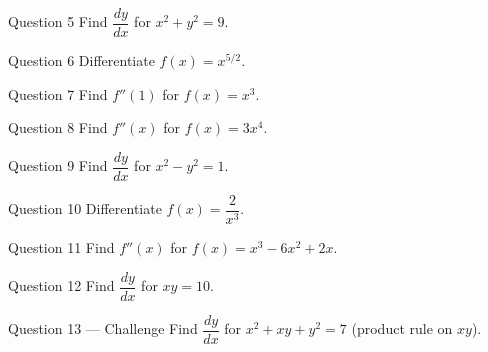 \documentclass[11pt]{article}
\begin{document}
\begin{qbox}{Question 5}
Find $\dfrac{dy}{dx}$ for $x^2+y^2=9$.\workspace{2.4cm}
\end{qbox}

\begin{qbox}{Question 6}
Differentiate $f(x)=x^{5/2}$.\workspace{2.4cm}
\end{qbox}

\begin{qbox}{Question 7}
Find $f''(1)$ for $f(x)=x^3$.\workspace{2.4cm}
\end{qbox}

\begin{qbox}{Question 8}
Find $f''(x)$ for $f(x)=3x^4$.\workspace{2.4cm}
\end{qbox}

\begin{qbox}{Question 9}
Find $\dfrac{dy}{dx}$ for $x^2-y^2=1$.\workspace{2.4cm}
\end{qbox}

\begin{qbox}{Question 10}
Differentiate $f(x)=\dfrac2{x^3}$.\workspace{2.4cm}
\end{qbox}

\begin{qbox}{Question 11}
Find $f''(x)$ for $f(x)=x^3-6x^2+2x$.\workspace{2.4cm}
\end{qbox}

\begin{qbox}{Question 12}
Find $\dfrac{dy}{dx}$ for $xy=10$.\workspace{2.4cm}
\end{qbox}

\begin{qbox}{Question 13 --- Challenge}
Find $\dfrac{dy}{dx}$ for $x^2+xy+y^2=7$ (product rule on $xy$).\workspace{3cm}
\end{qbox}

\clearpage
{}
\end{document}

